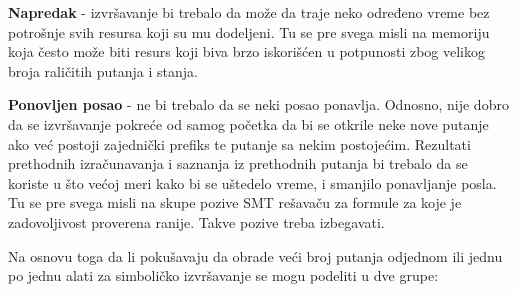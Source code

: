 \documentclass[12pt,oneside]{memoir}
\begin{document}
\begin{description}
    \item \textbf{Napredak} - izvršavanje bi trebalo da može da traje neko određeno vreme bez potrošnje svih resursa koji su mu dodeljeni. Tu se pre svega misli na memoriju koja često može biti resurs koji biva brzo iskorišćen u potpunosti zbog velikog broja raličitih putanja i stanja.
    
    \item \textbf{Ponovljen posao} - ne bi trebalo da se neki posao ponavlja. Odnosno, nije dobro da se izvršavanje pokreće od samog početka da bi se otkrile neke nove putanje ako već postoji zajednički prefiks te putanje sa nekim postojećim. Rezultati prethodnih izračunavanja i saznanja iz prethodnih putanja bi trebalo da se koriste u što većoj meri kako bi se uštedelo vreme, i smanjilo ponavljanje posla. Tu se pre svega misli na skupe pozive SMT rešavaču za formule za koje je zadovoljivost proverena ranije. Takve pozive treba izbegavati.
    
\end{description}
\bigskip
Na osnovu toga da li pokušavaju da obrade veći broj putanja odjednom ili jednu po jednu alati za simboličko izvršavanje se mogu podeliti u dve grupe:
\end{document}
